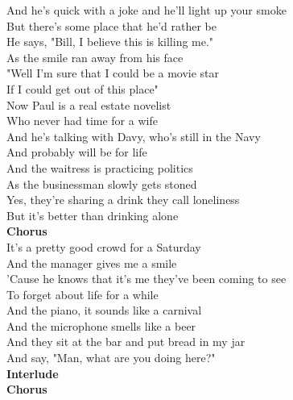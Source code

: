 And he's quick with a joke and he'll light up your smoke\\
But there's some place that he'd rather be\\
He says, "Bill, I believe this is killing me."\\
As the smile ran away from his face\\
"Well I'm sure that I could be a movie star\\
If I could get out of this place"\\
Now Paul is a real estate novelist\\
Who never had time for a wife\\
And he's talking with Davy, who's still in the Navy\\
And probably will be for life\\
And the waitress is practicing politics\\
As the businessman slowly gets stoned\\
Yes, they're sharing a drink they call loneliness\\
But it's better than drinking alone\\
\textbf{Chorus}\\
It's a pretty good crowd for a Saturday\\
And the manager gives me a smile\\
'Cause he knows that it's me they've been coming to see\\
To forget about life for a while\\
And the piano, it sounds like a carnival\\
And the microphone smells like a beer\\
And they sit at the bar and put bread in my jar\\
And say, "Man, what are you doing here?"\\
\textbf{Interlude}\\
\textbf{Chorus}\\
 
